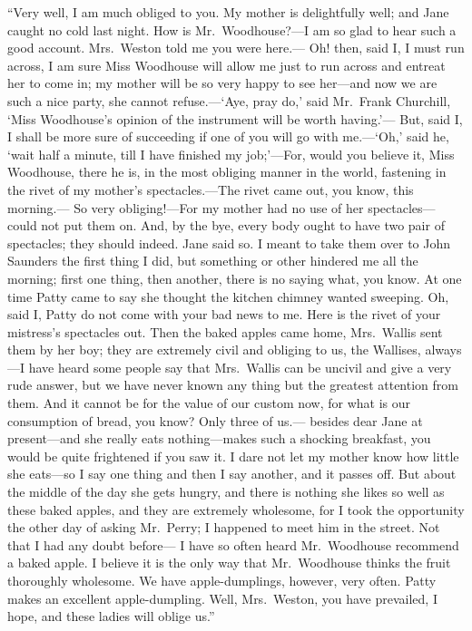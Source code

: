 ``Very well, I am much obliged to you.  My mother is delightfully well;
and Jane caught no cold last night.  How is Mr.\ Woodhouse?---I am so glad
to hear such a good account.  Mrs.\ Weston told me you were here.---%
Oh! then, said I, I must run across, I am sure Miss Woodhouse will
allow me just to run across and entreat her to come in; my mother
will be so very happy to see her---and now we are such a nice party,
she cannot refuse.---`Aye, pray do,' said Mr.\ Frank Churchill,
`Miss Woodhouse's opinion of the instrument will be worth having.'---%
But, said I, I shall be more sure of succeeding if one of you will go
with me.---`Oh,' said he, `wait half a minute, till I have finished
my job;'---For, would you believe it, Miss Woodhouse, there he is,
in the most obliging manner in the world, fastening in the rivet of my
mother's spectacles.---The rivet came out, you know, this morning.---%
So very obliging!---For my mother had no use of her spectacles---%
could not put them on.  And, by the bye, every body ought to have
two pair of spectacles; they should indeed.  Jane said so.
I meant to take them over to John Saunders the first thing I did,
but something or other hindered me all the morning; first one thing,
then another, there is no saying what, you know.  At one time Patty came
to say she thought the kitchen chimney wanted sweeping.  Oh, said I,
Patty do not come with your bad news to me.  Here is the rivet
of your mistress's spectacles out.  Then the baked apples came home,
Mrs.\ Wallis sent them by her boy; they are extremely civil and
obliging to us, the Wallises, always---I have heard some people
say that Mrs.\ Wallis can be uncivil and give a very rude answer,
but we have never known any thing but the greatest attention
from them.  And it cannot be for the value of our custom now,
for what is our consumption of bread, you know?  Only three of us.---%
besides dear Jane at present---and she really eats nothing---makes such
a shocking breakfast, you would be quite frightened if you saw it.
I dare not let my mother know how little she eats---so I say one
thing and then I say another, and it passes off.  But about the
middle of the day she gets hungry, and there is nothing she likes
so well as these baked apples, and they are extremely wholesome,
for I took the opportunity the other day of asking Mr.\ Perry;
I happened to meet him in the street.  Not that I had any doubt before---%
I have so often heard Mr.\ Woodhouse recommend a baked apple.
I believe it is the only way that Mr.\ Woodhouse thinks the
fruit thoroughly wholesome.  We have apple-dumplings, however,
very often.  Patty makes an excellent apple-dumpling. Well,
Mrs.\ Weston, you have prevailed, I hope, and these ladies will
oblige us.''

